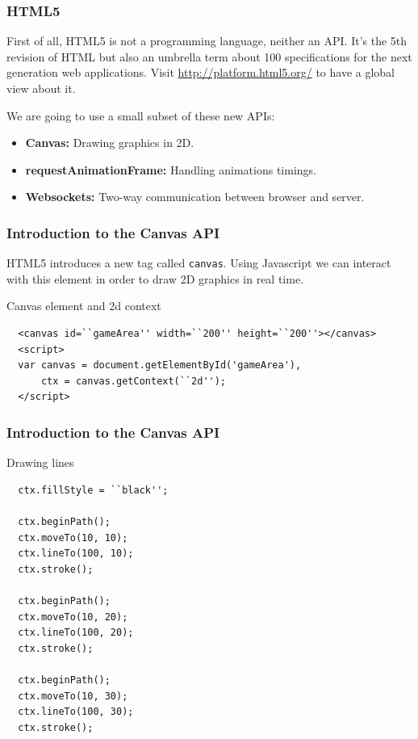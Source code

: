 \begin{frame}[fragile]
  \frametitle{HTML5}

  First of all, HTML5 is not a programming language, neither an API. It's the 5th revision of HTML but also an umbrella term about 100 specifications for the next generation web applications.
  Visit \url{http://platform.html5.org/} to have a global view about it.

  \pause

  We are going to use a small subset of these new APIs:
  \begin{itemize}
    \pause \item \textbf{Canvas:} Drawing graphics in 2D.
    \pause \item \textbf{requestAnimationFrame:} Handling animations timings.
    \pause \item \textbf{Websockets:} Two-way communication between browser and server.
  \end{itemize}
\end{frame}

\begin{frame}[fragile]
  \frametitle{Introduction to the Canvas API}

  HTML5 introduces a new tag called \texttt{canvas}. Using Javascript we can interact with this element in order to draw 2D graphics in real time.

  \begin{block}{Canvas element and 2d context}
  {\scriptsize
  \begin{verbatim}
  <canvas id=``gameArea'' width=``200'' height=``200''></canvas>
  <script>
  var canvas = document.getElementById('gameArea'),
      ctx = canvas.getContext(``2d'');
  </script>
  \end{verbatim}
  }
  \end{block}
\end{frame}

\begin{frame}[fragile]
  \frametitle{Introduction to the Canvas API}

  \begin{block}{Drawing lines}
  {\scriptsize
  \begin{verbatim}
  ctx.fillStyle = ``black'';

  ctx.beginPath();
  ctx.moveTo(10, 10);
  ctx.lineTo(100, 10);
  ctx.stroke();

  ctx.beginPath();
  ctx.moveTo(10, 20);
  ctx.lineTo(100, 20);
  ctx.stroke();

  ctx.beginPath();
  ctx.moveTo(10, 30);
  ctx.lineTo(100, 30);
  ctx.stroke();
  \end{verbatim}
  }
  \end{block}
\end{frame}

